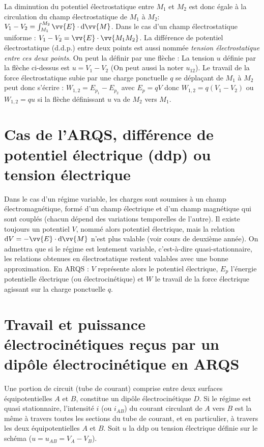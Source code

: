 La diminution du potentiel électrostatique entre $M_1$ et $M_2$ est donc égale à la circulation du champ électrostatique de $M_1$ à $M_2$: $V_1-V_2 = \int_{M_1}^{M_2} \vv{E} \cdot \D \vv{M}$.
Dans le cas d'un champ électrostatique uniforme : $V_1-V_2 = \vv{E} \cdot \vv{M_1M_2}$.
La différence de potentiel électrostatique (d.d.p.) entre deux points est aussi nommée \emph{tension électrostatique entre ces deux points}. On peut la définir par une flèche :
La tension $u$ définie par la flèche ci-dessus est $u=V_1-V_2$ (On peut aussi la noter $u_{12}$). Le travail de la force électrostatique subie par une charge ponctuelle $q$ se déplaçant de $M_1$ à $M_2$ peut donc s'écrire : $W_{1,2} = E_{p_1} - E_{p_2}$ avec $E_p = q V$ donc $W_{1,2} = q(V_1-V_2)$ ou  $W_{1,2} = q u$ si la flèche définissant $u$ va de $M_2$ vers $M_1$.

\section{Cas de l'ARQS, différence de potentiel électrique (ddp) ou tension électrique}
\label{chap9-sec:casdelARQS}

Dans le cas d'un régime variable, les charges sont soumises à un champ électromagnétique, formé d'un champ électrique et d'un champ magnétique qui sont couplés (chacun dépend des variations temporelles de l'autre). Il existe toujours un potentiel $V$, nommé alors potentiel électrique, mais la relation $\D V = -\vv{E} \cdot \D \vv{M}$ n'est plus valable (voir cours de deuxième année).
On admettra que si le régime est lentement variable, c'est-à-dire quasi-stationnaire, les relations obtenues en électrostatique restent valables avec une bonne approximation.
En ARQS : $V$ représente alors le potentiel électrique, $E_p$ l'énergie potentielle électrique (ou électrocinétique) et $W$ le travail de la force électrique agissant sur la charge ponctuelle $q$.

\section{Travail et puissance électrocinétiques reçus par un dipôle électrocinétique en ARQS}
\label{chap9-sec:travailetpuissance}

Une portion de circuit (tube de courant) comprise entre deux surfaces équipotentielles $A$ et $B$, constitue un dipôle électrocinétique $D$. Si le régime est quasi stationnaire, l'intensité $i$ (ou $i_{AB}$)  du courant circulant de $A$ vers $B$ est la même à travers toutes les sections du tube de courant, et en particulier, à travers les deux équipotentielles $A$ et $B$. Soit $u$ la ddp ou tension électrique définie sur le schéma ($u = u_{AB} = V_A - V_B$). 

